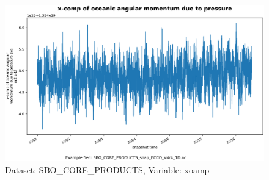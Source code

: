 \begin{figure}[H]
\centering
\includegraphics[scale=0.55]{../images/plots/oneD_plots/SBO_Core_Products/xoamp.png}
\caption{Dataset: SBO\_CORE\_PRODUCTS, Variable: xoamp}
\label{tab:table-SBO_CORE_PRODUCTS_xoamp-Plot}
\end{figure}
\pagebreak
